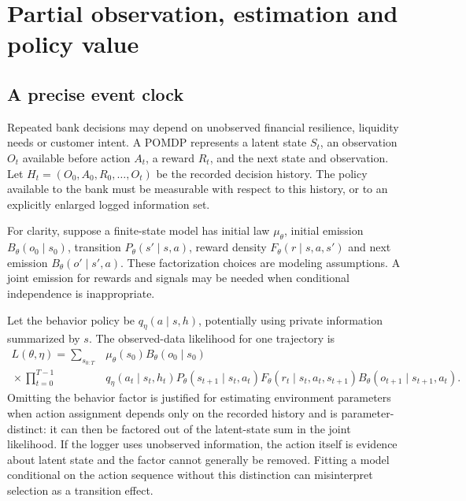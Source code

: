 \chapter{Partial observation, estimation and policy value}\label{ch:pomdp}
\section{A precise event clock}
Repeated bank decisions may depend on unobserved financial resilience,
liquidity needs or customer intent. A POMDP represents a latent state $S_t$,
an observation $O_t$ available before action $A_t$, a reward $R_t$, and
the next state and observation. Let
$H_t=(O_0,A_0,R_0,\ldots,O_t)$ be the recorded decision history.
The policy available to the bank must be measurable with respect to this
history, or to an explicitly enlarged logged information set.

For clarity, suppose a finite-state model has initial law $\mu_\theta$,
initial emission $B_\theta(o_0\mid s_0)$, transition
$P_\theta(s'\mid s,a)$, reward density $F_\theta(r\mid s,a,s')$
and next emission $B_\theta(o'\mid s',a)$. These factorization choices
are modeling assumptions. A joint emission for rewards and signals may be
needed when conditional independence is inappropriate.

Let the behavior policy be $q_\eta(a\mid s,h)$, potentially using private
information summarized by $s$. The observed-data likelihood for one
trajectory is
\begin{align}
 L(\theta,\eta)=\sum_{s_{0:T}}&
 \mu_\theta(s_0)B_\theta(o_0\mid s_0)\nonumber\\
 {}\times\prod_{t=0}^{T-1}&
 q_\eta(a_t\mid s_t,h_t)
 P_\theta(s_{t+1}\mid s_t,a_t)
 F_\theta(r_t\mid s_t,a_t,s_{t+1})
 B_\theta(o_{t+1}\mid s_{t+1},a_t).
 \label{eq:pomdplikelihood}
\end{align}
Omitting the behavior factor is justified for estimating environment
parameters when action assignment depends only on the recorded history
and is parameter-distinct: it can then be factored out of the latent-state
sum in the joint likelihood. If the logger uses unobserved information,
the action itself is evidence about latent state and the factor cannot
generally be removed. Fitting a model conditional on the action sequence
without this distinction can misinterpret selection as a transition effect.

